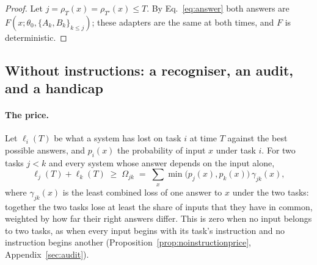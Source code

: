 \begin{proof}
Let $j = \rho_T(x) = \rho_{T'}(x) \le T$. By Eq.~\eqref{eq:answer} both answers are
$F(x; \theta_0, \{A_k, B_k\}_{k \le j})$; these adapters are the same at both times, and $F$ is
deterministic.
\end{proof}

\subsection{Without instructions: a recogniser, an audit, and a handicap}
\label{sec:recogmain}

\paragraph{The price.} Let $\ell_i(T)$ be what a system has lost on task $i$ at time $T$ against the
best possible answers, and $p_i(x)$ the probability of input $x$ under task $i$. For two tasks
$j < k$ and every system whose answer depends on the input alone,
\begin{equation}
  \ell_j(T) + \ell_k(T) \;\ge\; \Omega_{jk} \;=\; \sum_x \min\bigl(p_j(x), p_k(x)\bigr)\, \gamma_{jk}(x),
  \label{eq:priceshort}
\end{equation}
where $\gamma_{jk}(x)$ is the least combined loss of one answer to $x$ under the two tasks: together
the two tasks lose at least the share of inputs that they have in common, weighted by how far their
right answers differ. This is zero when no input belongs to two tasks, as when every input begins
with its task's instruction and no instruction begins another
(Proposition~\ref{prop:noinstructionprice}, Appendix~\ref{sec:audit}).

